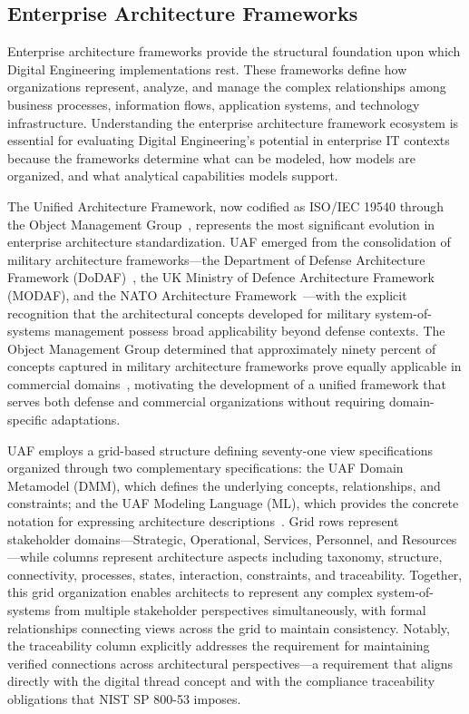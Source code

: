 \subsection{Enterprise Architecture Frameworks}

Enterprise architecture frameworks provide the structural foundation upon which Digital Engineering implementations rest. These frameworks define how organizations represent, analyze, and manage the complex relationships among business processes, information flows, application systems, and technology infrastructure. Understanding the enterprise architecture framework ecosystem is essential for evaluating Digital Engineering's potential in enterprise IT contexts because the frameworks determine what can be modeled, how models are organized, and what analytical capabilities models support.

The Unified Architecture Framework, now codified as ISO/IEC 19540 through the Object Management Group~\parencite{OMG_UAF_2022}, represents the most significant evolution in enterprise architecture standardization. UAF emerged from the consolidation of military architecture frameworks---the Department of Defense Architecture Framework (DoDAF)~\parencite{DoDAF_2009}, the UK Ministry of Defence Architecture Framework (MODAF), and the NATO Architecture Framework~\parencite{NATO_NAF_2018}---with the explicit recognition that the architectural concepts developed for military system-of-systems management possess broad applicability beyond defense contexts. The Object Management Group determined that approximately ninety percent of concepts captured in military architecture frameworks prove equally applicable in commercial domains~\parencite{OMG_UAF_About_2024}, motivating the development of a unified framework that serves both defense and commercial organizations without requiring domain-specific adaptations.

UAF employs a grid-based structure defining seventy-one view specifications organized through two complementary specifications: the UAF Domain Metamodel (DMM), which defines the underlying concepts, relationships, and constraints; and the UAF Modeling Language (ML), which provides the concrete notation for expressing architecture descriptions~\parencite{OMG_UAF_Spec_2022}. Grid rows represent stakeholder domains---Strategic, Operational, Services, Personnel, and Resources---while columns represent architecture aspects including taxonomy, structure, connectivity, processes, states, interaction, constraints, and traceability. Together, this grid organization enables architects to represent any complex system-of-systems from multiple stakeholder perspectives simultaneously, with formal relationships connecting views across the grid to maintain consistency. Notably, the traceability column explicitly addresses the requirement for maintaining verified connections across architectural perspectives---a requirement that aligns directly with the digital thread concept and with the compliance traceability obligations that NIST SP 800-53 imposes.

